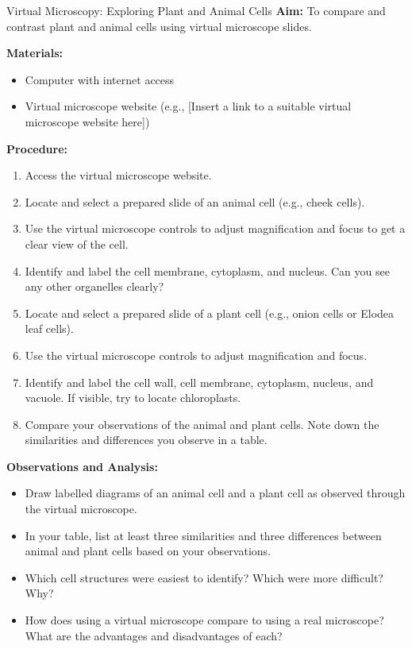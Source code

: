 \begin{investigation}{Virtual Microscopy: Exploring Plant and Animal Cells}
\textbf{Aim:} To compare and contrast plant and animal cells using virtual microscope slides.

\textbf{Materials:}
\begin{itemize}
    \item Computer with internet access
    \item Virtual microscope website (e.g., [Insert a link to a suitable virtual microscope website here])
\end{itemize}

\textbf{Procedure:}
\begin{enumerate}
    \item Access the virtual microscope website.
    \item Locate and select a prepared slide of an animal cell (e.g., cheek cells).
    \item Use the virtual microscope controls to adjust magnification and focus to get a clear view of the cell.
    \item Identify and label the cell membrane, cytoplasm, and nucleus.  Can you see any other organelles clearly?
    \item Locate and select a prepared slide of a plant cell (e.g., onion cells or Elodea leaf cells).
    \item Use the virtual microscope controls to adjust magnification and focus.
    \item Identify and label the cell wall, cell membrane, cytoplasm, nucleus, and vacuole. If visible, try to locate chloroplasts.
    \item Compare your observations of the animal and plant cells.  Note down the similarities and differences you observe in a table.
\end{enumerate}

\textbf{Observations and Analysis:}
\begin{itemize}
    \item Draw labelled diagrams of an animal cell and a plant cell as observed through the virtual microscope.
    \item In your table, list at least three similarities and three differences between animal and plant cells based on your observations.
    \item Which cell structures were easiest to identify? Which were more difficult? Why?
    \item How does using a virtual microscope compare to using a real microscope? What are the advantages and disadvantages of each?
\end{itemize}
\end{investigation}

